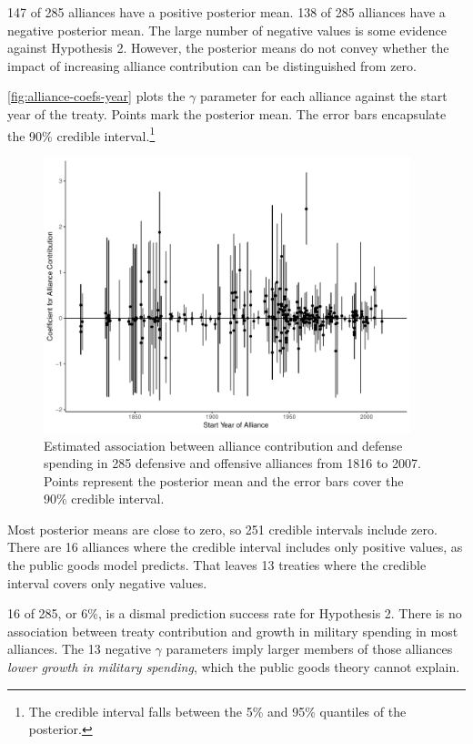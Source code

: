 \documentclass[12pt]{article}
\begin{document}
147 of 285 alliances have a positive posterior mean. 
138 of 285 alliances have a negative posterior mean. 
The large number of negative values is some evidence against Hypothesis 2. 
However, the posterior means do not convey whether the impact of increasing alliance contribution can be distinguished from zero. 


\autoref{fig:alliance-coefs-year} plots the $\gamma$ parameter for each alliance against the start year of the treaty.
Points mark the posterior mean. 
The error bars encapsulate the 90\% credible interval.\footnote{The credible interval falls between the 5\% and 95\% quantiles of the posterior.}  


\begin{figure}[htbp]
	\centering
		\includegraphics[width=0.95\textwidth]{alliance-coefs-year.pdf}
	\caption{Estimated association between alliance contribution and defense spending in 285 defensive and offensive alliances from 1816 to 2007. Points represent the posterior mean and the error bars cover the 90\% credible interval.}
	\label{fig:alliance-coefs-year}
\end{figure}


Most posterior means are close to zero, so 251 credible intervals include zero. 
There are 16 alliances where the credible interval includes only positive values, as the public goods model predicts. 
That leaves 13 treaties where the credible interval covers only negative values. 


16 of 285, or 6\%, is a dismal prediction success rate for Hypothesis 2. 
There is no association between treaty contribution and growth in military spending in most alliances.
The 13 negative $\gamma$ parameters imply larger members of those alliances \emph{lower growth in military spending}, which the public goods theory cannot explain. 
\end{document}
